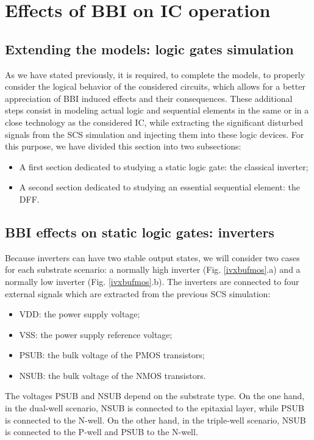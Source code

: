 
\section{Effects of BBI on IC operation}
\subsection{Extending the models: logic gates simulation}
	As we have stated previously, it is required, to complete the models, to properly consider the logical behavior of the considered circuits, which allows for a better appreciation of BBI induced effects and their consequences.
	These additional steps consist in modeling actual logic and sequential elements in the same or in a close technology as the considered IC, while extracting the significant disturbed signals from the SCS simulation and injecting them into these logic devices.
	For this purpose, we have divided this section into two subsections:
	\begin{itemize}
		\item A first section dedicated to studying a static logic gate: the classical inverter;
		\item A second section dedicated to studying an essential sequential element: the DFF.
	\end{itemize}

\subsection{BBI effects on static logic gates: inverters}
	
	Because inverters can have two stable output states, we will consider two cases for each substrate scenario: a normally high inverter (Fig. \ref{ivxbufmos}.a) and a normally low inverter (Fig. \ref{ivxbufmos}.b).
	The inverters are connected to four external signals which are extracted from the previous SCS simulation:
	\begin{itemize}
			\item VDD: the power supply voltage;
			\item VSS: the power supply reference voltage;
			\item PSUB: the bulk voltage of the PMOS transistors;
			\item NSUB: the bulk voltage of the NMOS transistors.
		\end{itemize}
	The voltages PSUB and NSUB depend on the substrate type.
	On the one hand, in the dual-well scenario, NSUB is connected to the epitaxial layer, while PSUB is connected to the N-well.
	On the other hand, in the triple-well scenario, NSUB is connected to the P-well and PSUB to the N-well.

